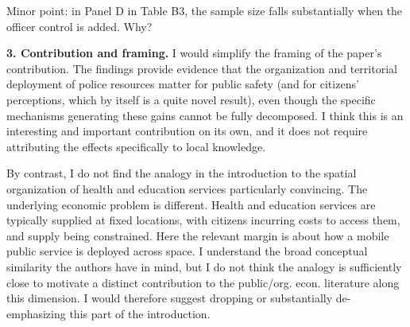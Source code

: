 \begin{bibunit}
\begin{refcomment}
\smallskip

Minor point: in Panel D in Table B3, the sample size falls substantially when the officer control is added. Why?

\label{pt:r1_03}
\end{refcomment}

\begin{response}
	
\end{response}


\begin{refcomment}
\smallskip

\textbf{3. Contribution and framing.} I would simplify the framing of the paper's contribution. The findings provide evidence that the organization and territorial deployment of police resources matter for public safety (and for citizens' perceptions, which by itself is a quite novel result), even though the specific mechanisms generating these gains cannot be fully decomposed. I think this is an interesting and important contribution on its own, and it does not require attributing the effects specifically to local knowledge.

\label{pt:r1_04}
\end{refcomment}

\begin{response}
	
\end{response}


\begin{refcomment}
\smallskip

By contrast, I do not find the analogy in the introduction to the spatial organization of health and education services particularly convincing. The underlying economic problem is different. Health and education services are typically supplied at fixed locations, with citizens incurring costs to access them, and supply being constrained. Here the relevant margin is about how a mobile public service is deployed across space. I understand the broad conceptual similarity the authors have in mind, but I do not think the analogy is sufficiently close to motivate a distinct contribution to the public/org. econ. literature along this dimension. I would therefore suggest dropping or substantially de-emphasizing this part of the introduction.

\label{pt:r1_05}
\end{refcomment}

\begin{response}
	
\end{response}

\putbib
\end{bibunit}

